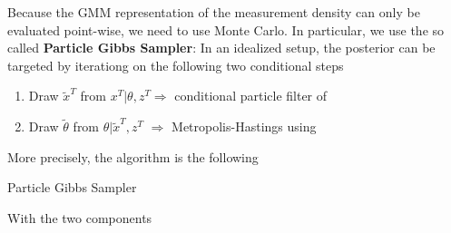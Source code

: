 \documentclass[11pt, letterpaper, notitlepage]{article}
\begin{document}
Because the GMM representation of the measurement density can only be evaluated point-wise, we need to use Monte Carlo. In particular, we use the so called \textbf{Particle Gibbs Sampler}: In an idealized setup, the posterior can be targeted by iterationg on the following two conditional steps
\begin{enumerate}
\item Draw $\tilde x^T$ from $x^T | \theta, z^T$\hspace{9mm}$\Rightarrow$\hspace{5mm} conditional particle filter of \cite{ADH_2010} 
\item Draw $\tilde{\theta}$ from $\theta | \tilde x^T, z^T$ \hspace{1cm}$\Rightarrow$\hspace{5mm} Metropolis-Hastings using \cite{ChernozhukovHong_2003}
\end{enumerate}\vspace{3mm}
More precisely, the algorithm is the following
\begin{algorithm}[htb]


 \SetStartEndCondition{ }{}{}%
 \SetInd{.5em}{2em} 
   
 \BlankLine
 \BlankLine  
 \caption{Particle Gibbs Sampler}
\end{algorithm}

With the two components
\end{document}
